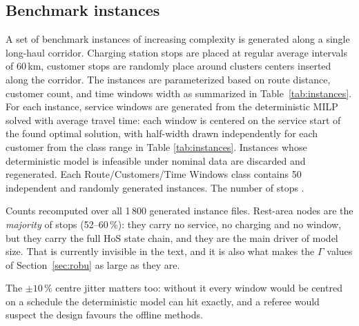 \subsection{Benchmark instances} \label{sec:instances}

A set of benchmark instances of increasing complexity is generated along a single long-haul corridor. Charging station stops are placed at regular average intervals of 60\,km, customer stops are randomly place around clusters centers inserted along the corridor. The instances are parameterized based on route distance, customer count, and time windows width as summarized in Table~\ref{tab:instances}. For each instance, service windows are generated from the deterministic MILP solved with average travel time: each window is centered on the service start of the found optimal solution, with half-width drawn independently for each customer from the class range in Table \ref{tab:instances}. Instances whose deterministic model is infeasible under nominal data are discarded and regenerated. Each Route/Customers/Time Windows class contains 50 independent and randomly generated instances. The number of stops .

\begin{acmt}
Counts recomputed over all 1\,800 generated instance files. Rest-area nodes are
the \emph{majority} of stops (52--60\,\%): they carry no service, no charging and
no window, but they carry the full HoS state chain, and they are the main driver
of model size. That is currently invisible in the text, and it is also what makes
the $\Gamma$ values of Section~\ref{sec:robu} as large as they are.

\medskip
The $\pm10\,\%$ centre jitter matters too: without it every window would be
centred on a schedule the deterministic model can hit exactly, and a referee
would suspect the design favours the offline methods.
\end{acmt}

